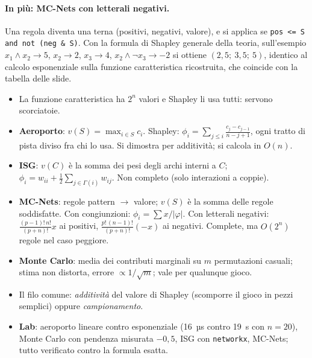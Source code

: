 \paragraph{In più: MC-Nets con letterali negativi.}
Una regola diventa una terna (positivi, negativi, valore), e si applica se
\texttt{pos <= S and not (neg \& S)}. Con la formula di Shapley generale della teoria,
sull'esempio $x_1 \land x_2 \to 5$, $x_2 \to 2$, $x_3 \to 4$, $x_2 \land \lnot x_3 \to -2$
si ottiene $(2{,}5;\ 3{,}5;\ 5)$, identico al calcolo esponenziale sulla funzione
caratteristica ricostruita, che coincide con la tabella delle slide.

\begin{riepilogo}
\begin{itemize}
  \item La funzione caratteristica ha $2^n$ valori e Shapley li usa tutti: servono
        scorciatoie.
  \item \textbf{Aeroporto}: $v(S) = \max_{i\in S} c_i$. Shapley:
        $\phi_i = \sum_{j \le i} \frac{c_j - c_{j-1}}{n-j+1}$, ogni tratto di pista diviso
        fra chi lo usa. Si dimostra per additività; si calcola in $O(n)$.
  \item \textbf{ISG}: $v(C)$ è la somma dei pesi degli archi interni a $C$;
        $\phi_i = w_{ii} + \frac12 \sum_{j\in\Gamma(i)} w_{ij}$. Non completo (solo
        interazioni a coppie).
  \item \textbf{MC-Nets}: regole pattern $\to$ valore; $v(S)$ è la somma delle regole
        soddisfatte. Con congiunzioni: $\phi_i = \sum x/|\varphi|$. Con letterali negativi:
        $\frac{(p-1)!\,n!}{(p+n)!}x$ ai positivi, $\frac{p!\,(n-1)!}{(p+n)!}(-x)$ ai
        negativi. Complete, ma $O(2^n)$ regole nel caso peggiore.
  \item \textbf{Monte Carlo}: media dei contributi marginali su $m$ permutazioni casuali;
        stima non distorta, errore $\propto 1/\sqrt{m}$; vale per qualunque gioco.
  \item Il filo comune: \emph{additività} del valore di Shapley (scomporre il gioco in pezzi
        semplici) oppure \emph{campionamento}.
  \item \textbf{Lab}: aeroporto lineare contro esponenziale (16~µs contro 19~s con
        $n=20$), Monte Carlo con pendenza misurata $-0{,}5$, ISG con \texttt{networkx},
        MC-Nets; tutto verificato contro la formula esatta.
\end{itemize}
\end{riepilogo}
